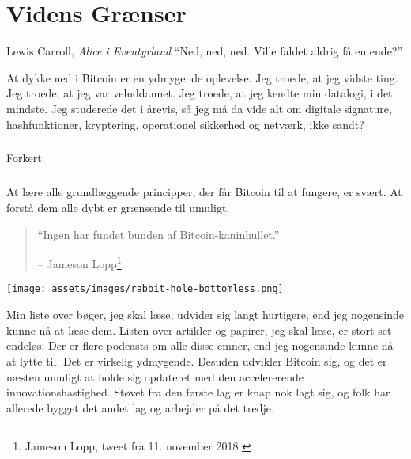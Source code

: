 \chapter{Videns Grænser}
\label{les:7}

\begin{chapquote}{Lewis Carroll, \textit{Alice i Eventyrland}}
\enquote{Ned, ned, ned. Ville faldet aldrig få en ende?}
\end{chapquote}

At dykke ned i Bitcoin er en ydmygende oplevelse. Jeg troede, at jeg vidste ting. Jeg troede, at jeg var veluddannet. Jeg troede, at jeg kendte min datalogi, i det mindste. Jeg studerede det i årevis, så jeg må da vide alt om digitale signature, hashfunktioner, kryptering, operationel sikkerhed og netværk, ikke sandt?

\paragraph{}
Forkert.

\paragraph{}
At lære alle grundlæggende principper, der får Bitcoin til at fungere, er svært. At forstå dem alle dybt er grænsende til umuligt.

\begin{quotation}\begin{samepage}
\enquote{Ingen har fundet bunden af Bitcoin-kaninhullet.}
\begin{flushright} -- Jameson Lopp\footnote{Jameson Lopp, tweet fra 11. november 2018 \cite{lopp-tweet}}
\end{flushright}\end{samepage}\end{quotation}

\begin{center}
\centering
\texttt{[image: assets/images/rabbit-hole-bottomless.png]}
\label{fig:rabbit-hole-bottomless}
\end{center}


Min liste over bøger, jeg skal læse, udvider sig langt hurtigere, end jeg nogensinde kunne nå at læse dem. Listen over artikler og papirer, jeg skal læse, er stort set endeløs. Der er flere podcasts om alle disse emner, end jeg nogensinde kunne nå at lytte til. Det er virkelig ydmygende. Desuden udvikler Bitcoin sig, og det er næsten umuligt at holde sig opdateret med den accelererende innovationshastighed. Støvet fra den første lag er knap nok lagt sig, og folk har allerede bygget det andet lag og arbejder på det tredje.

